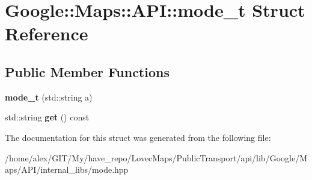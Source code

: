 \hypertarget{structGoogle_1_1Maps_1_1API_1_1mode__t}{}\section{Google\+:\+:Maps\+:\+:A\+PI\+:\+:mode\+\_\+t Struct Reference}
\label{structGoogle_1_1Maps_1_1API_1_1mode__t}
\subsection*{Public Member Functions}
\begin{DoxyCompactItemize}
\item 
\mbox{\label{structGoogle_1_1Maps_1_1API_1_1mode__t_a9cbdbd6096f389a15acdbefa19490235}} 
{\bfseries mode\+\_\+t} (std\+::string a)
\item 
\mbox{\label{structGoogle_1_1Maps_1_1API_1_1mode__t_a84b8a1aa0c105d5d6a530777dcd9d4b4}} 
std\+::string {\bfseries get} () const
\end{DoxyCompactItemize}


The documentation for this struct was generated from the following file\+:\begin{DoxyCompactItemize}
\item 
/home/alex/\+G\+I\+T/\+My/have\+\_\+repo/\+Lovec\+Maps/\+Public\+Transport/api/lib/\+Google/\+Maps/\+A\+P\+I/internal\+\_\+libs/mode.\+hpp\end{DoxyCompactItemize}
